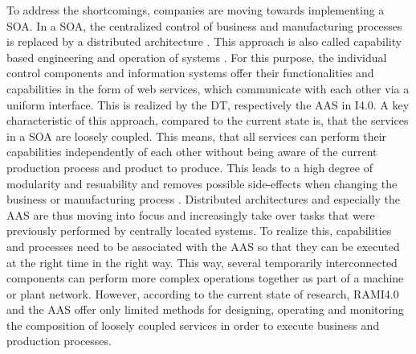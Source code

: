 To address the shortcomings, companies are moving towards implementing a \ac{SOA}. In a \ac{SOA}, the centralized control of business and manufacturing processes is replaced by a distributed architecture \cite[p. 861]{Uslander2015ReferenceApproach}. This approach is also called capability based engineering and operation of systems \cite[p. 5]{Bayha2020DescribingComponents}. For this purpose, the individual control components and information systems offer their functionalities and capabilities in the form of web services, which communicate with each other via a uniform interface. This is realized by the \ac{DT}, respectively the \ac{AAS} in \ac{I4.0}. A key characteristic of this approach, compared to the current state is, that the services in a \ac{SOA} are loosely coupled. This means, that all services can perform their capabilities independently of each other without being aware of the current production process and product to produce. This leads to a high degree of modularity and resuability and removes possible side-effects when changing the business or manufacturing process \cite[p. 491]{Schicke2020EnablingTwins}. Distributed architectures and especially the \ac{AAS} are thus moving into focus and increasingly take over tasks that were previously performed by centrally located systems. To realize this, capabilities and processes need to be associated with the \ac{AAS} so that they can be executed at the right time in the right way. This way, several temporarily interconnected components can perform more complex operations together as part of a machine or plant network. However, according to the current state of research, \ac{RAMI4.0} and the \ac{AAS} offer only limited methods for designing, operating and monitoring the composition of loosely coupled services in order to execute business and production processes. 


